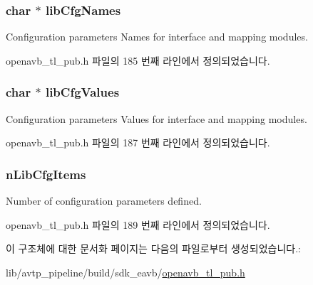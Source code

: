 \subsubsection[{\texorpdfstring{lib\+Cfg\+Names}{libCfgNames}}]{\setlength{\rightskip}{0pt plus 5cm}char $\ast$ lib\+Cfg\+Names}\hypertarget{structopenavb__tl__cfg__name__value__t_a6b520d18dfa6f6e0db32a7aaab48c507}{}\label{structopenavb__tl__cfg__name__value__t_a6b520d18dfa6f6e0db32a7aaab48c507}


Configuration parameters Names for interface and mapping modules. 



openavb\+\_\+tl\+\_\+pub.\+h 파일의 185 번째 라인에서 정의되었습니다.

\subsubsection[{\texorpdfstring{lib\+Cfg\+Values}{libCfgValues}}]{\setlength{\rightskip}{0pt plus 5cm}char $\ast$ lib\+Cfg\+Values}\hypertarget{structopenavb__tl__cfg__name__value__t_a411ec7f07600718814c00ea5d84cecaf}{}\label{structopenavb__tl__cfg__name__value__t_a411ec7f07600718814c00ea5d84cecaf}


Configuration parameters Values for interface and mapping modules. 



openavb\+\_\+tl\+\_\+pub.\+h 파일의 187 번째 라인에서 정의되었습니다.

\subsubsection[{\texorpdfstring{n\+Lib\+Cfg\+Items}{nLibCfgItems}}]{ n\+Lib\+Cfg\+Items}\hypertarget{structopenavb__tl__cfg__name__value__t_ae7093f79d1305efd2444e40c505e74bc}{}\label{structopenavb__tl__cfg__name__value__t_ae7093f79d1305efd2444e40c505e74bc}


Number of configuration parameters defined. 



openavb\+\_\+tl\+\_\+pub.\+h 파일의 189 번째 라인에서 정의되었습니다.



이 구조체에 대한 문서화 페이지는 다음의 파일로부터 생성되었습니다.\+:\begin{DoxyCompactItemize}
\item 
lib/avtp\+\_\+pipeline/build/sdk\+\_\+eavb/\hyperlink{build_2sdk__eavb_2openavb__tl__pub_8h}{openavb\+\_\+tl\+\_\+pub.\+h}\end{DoxyCompactItemize}
